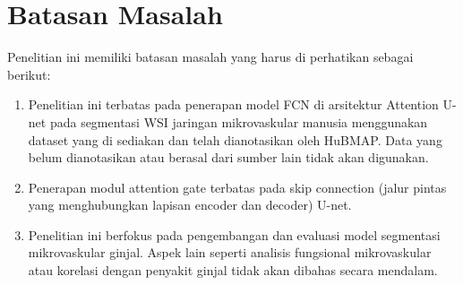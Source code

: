 \section{Batasan Masalah}
\noindent Penelitian ini memiliki batasan masalah yang harus di perhatikan sebagai berikut:
\begin{enumerate}
	\item Penelitian ini terbatas pada penerapan model FCN di arsitektur Attention U-net pada segmentasi WSI jaringan mikrovaskular manusia menggunakan dataset yang di sediakan dan telah dianotasikan oleh HuBMAP. Data yang belum dianotasikan atau berasal dari sumber lain tidak akan digunakan.
	\item Penerapan modul attention gate terbatas pada skip connection (jalur pintas yang menghubungkan lapisan encoder dan decoder) U-net.
	\item Penelitian ini berfokus pada pengembangan dan evaluasi model segmentasi mikrovaskular ginjal. Aspek lain seperti analisis fungsional mikrovaskular atau korelasi dengan penyakit ginjal tidak akan dibahas secara mendalam.
\end{enumerate}

